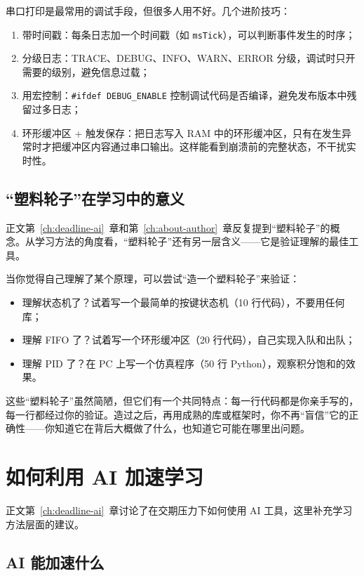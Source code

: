 串口打印是最常用的调试手段，但很多人用不好。几个进阶技巧：

\begin{enumerate}
	\item 带时间戳：每条日志加一个时间戳（如 \texttt{msTick}），可以判断事件发生的时序；
	\item 分级日志：TRACE、DEBUG、INFO、WARN、ERROR 分级，调试时只开需要的级别，避免信息过载；
	\item 用宏控制：\texttt{\#ifdef DEBUG\_ENABLE} 控制调试代码是否编译，避免发布版本中残留过多日志；
	\item 环形缓冲区 + 触发保存：把日志写入 RAM 中的环形缓冲区，只有在发生异常时才把缓冲区内容通过串口输出。这样能看到崩溃前的完整状态，不干扰实时性。
\end{enumerate}

\subsection{“塑料轮子”在学习中的意义}

正文第~\ref{ch:deadline-ai}~章和第~\ref{ch:about-author}~章反复提到“塑料轮子”的概念。从学习方法的角度看，“塑料轮子”还有另一层含义——它是验证理解的最佳工具。

当你觉得自己理解了某个原理，可以尝试“造一个塑料轮子”来验证：
\begin{itemize}
	\item 理解状态机了？试着写一个最简单的按键状态机（10 行代码），不要用任何库；
	\item 理解 FIFO 了？试着写一个环形缓冲区（20 行代码），自己实现入队和出队；
	\item 理解 PID 了？在 PC 上写一个仿真程序（50 行 Python），观察积分饱和的效果。
\end{itemize}

这些“塑料轮子”虽然简陋，但它们有一个共同特点：每一行代码都是你亲手写的，每一行都经过你的验证。造过之后，再用成熟的库或框架时，你不再“盲信”它的正确性——你知道它在背后大概做了什么，也知道它可能在哪里出问题。

\section{如何利用 AI 加速学习}

正文第~\ref{ch:deadline-ai}~章讨论了在交期压力下如何使用 AI 工具，这里补充学习方法层面的建议。

\subsection{AI 能加速什么}

